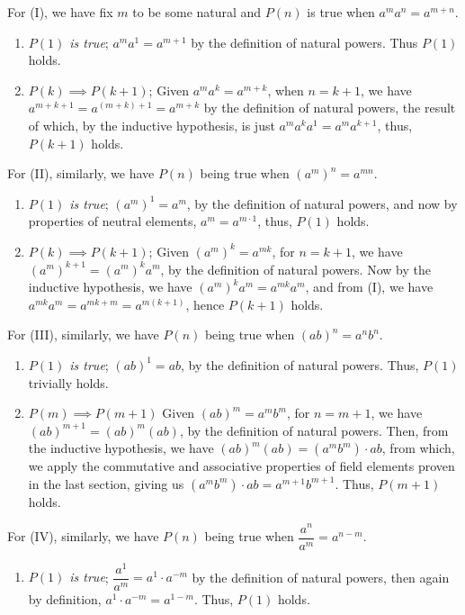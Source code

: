 \documentclass[12pt]{book}
\theoremstyle{definition}
\begin{document}
\begin{sol}
	For (I), we have fix $m$ to be some natural and $P(n)$ is true when $a^ma^n = a^{m+n}$. 
\begin{enumerate}[label = (\roman*)]
	\item \textit{$P(1)$ is true}; $a^ma^1=a^{m+1}$ by the definition of natural powers. Thus $P(1)$ holds.
	\item $P(k)\implies P(k+1)$; Given $a^ma^k = a^{m+k}$, when $n=k+1$, we have $a^{m+k+1}= a^{(m+k)+1}=a^{m+k}$ by the definition of natural powers, the result of which, by the inductive hypothesis, is just $a^ma^ka^1=a^ma^{k+1}$, thus, $P(k+1)$ holds. 
\end{enumerate}
For (II), similarly, we have $P(n)$ being true when $(a^m)^n=a^{mn}$.
\begin{enumerate}[label = (\roman*)]
	\item \textit{$P(1)$ is true}; $(a^m)^1=a^m$, by the definition of natural powers, and now by properties of neutral elements, $a^m = a^{m\cdot 1}$, thus, $P(1)$ holds.
	\item $P(k)\implies P(k+1)$; Given $(a^m)^k=a^{mk}$, for $n=k+1$, we have $(a^m)^{k+1}=(a^m)^ka^m$, by the definition of natural powers. Now by the inductive hypothesis, we have $(a^m)^ka^m= a^{mk}a^m$, and from (I), we have $a^{mk}a^m= a^{mk+m} = a^{m(k+1)}$, hence $P(k+1)$ holds.
\end{enumerate}
For (III), similarly, we have $P(n)$ being true when $(ab)^n = a^nb^n$.
\begin{enumerate}[label = (\roman*)]
	\item \textit{$P(1)$ is true}; $(ab)^1=ab$, by the definition of natural powers. Thus, $P(1)$ trivially holds.
	\item $P(m)\implies P(m+1)$ Given $(ab)^m=a^mb^m$, for $n=m+1$, we have $(ab)^{m+1} = (ab)^m(ab)$, by the definition of natural powers. Then, from the inductive hypothesis, we have $(ab)^m(ab) = (a^mb^m)\cdot ab$, from which, we apply the commutative and associative properties of field elements proven in the last section, giving us $(a^mb^m)\cdot ab = a^{m+1}b^{m+1}$. Thus, $P(m+1)$ holds.
\end{enumerate}
For (IV), similarly, we have $P(n)$ being true when $\dfrac{a^n}{a^m}=a^{n-m}$.
\begin{enumerate}[label = (\roman*)]
	\item \textit{$P(1)$ is true}; $\dfrac{a^1}{a^m}=a^1\cdot a^{-m}$ by the definition of natural powers, then again by definition, $a^1\cdot a^{-m}= a^{1-m}$. Thus, $P(1)$ holds.

\end{enumerate}
\end{sol}
\end{document}
